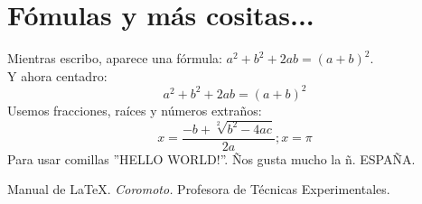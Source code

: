 \documentclass{article}
\begin{document}
    \section{Fómulas y más cositas...}
      Mientras escribo, aparece una fórmula: $a^2+b^2+2ab = (a+b)^2$.\\
      Y ahora centadro:
	$$a^2+b^2+2ab = (a+b)^2$$
      Usemos fracciones, raíces y números extraños:
	$$x=\frac{-b+\sqrt[2]{b^2-4ac}}{2a}; x=\pi$$
      Para usar comillas ''HELLO WORLD!''. \~Nos gusta mucho la \~n. ESPA\~NA.
  \begin{thebibliography}{99}
      Manual de \LaTeX.
      \emph{Coromoto.} Profesora de Técnicas Experimentales.
  \end{thebibliography}
\end{document}
